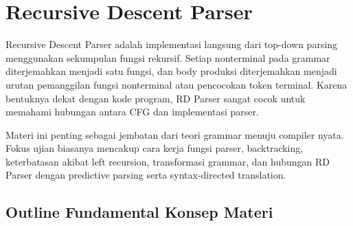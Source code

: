 \section{Recursive Descent Parser}

Recursive Descent Parser adalah implementasi langsung dari top-down parsing menggunakan sekumpulan fungsi rekursif. Setiap nonterminal pada grammar diterjemahkan menjadi satu fungsi, dan body produksi diterjemahkan menjadi urutan pemanggilan fungsi nonterminal atau pencocokan token terminal. Karena bentuknya dekat dengan kode program, RD Parser sangat cocok untuk memahami hubungan antara CFG dan implementasi parser.

Materi ini penting sebagai jembatan dari teori grammar menuju compiler nyata. Fokus ujian biasanya mencakup cara kerja fungsi parser, backtracking, keterbatasan akibat left recursion, transformasi grammar, dan hubungan RD Parser dengan predictive parsing serta syntax-directed translation.

\subsection{Outline Fundamental Konsep Materi}

